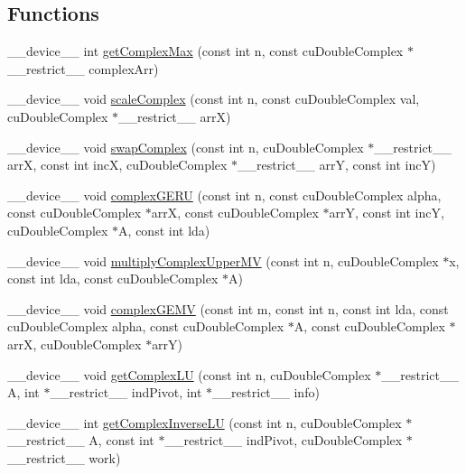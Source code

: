 \subsection*{Functions}
\begin{DoxyCompactItemize}
\item 
\+\_\+\+\_\+device\+\_\+\+\_\+ int \hyperlink{complexInverse_8cu_a8336c0132b5bf7f80e1a65443b2d9465}{get\+Complex\+Max} (const int n, const cu\+Double\+Complex $\ast$\+\_\+\+\_\+restrict\+\_\+\+\_\+ complex\+Arr)
\item 
\+\_\+\+\_\+device\+\_\+\+\_\+ void \hyperlink{complexInverse_8cu_aedd1b59cd1eff341e90ba6c6aaada0fd}{scale\+Complex} (const int n, const cu\+Double\+Complex val, cu\+Double\+Complex $\ast$\+\_\+\+\_\+restrict\+\_\+\+\_\+ arrX)
\item 
\+\_\+\+\_\+device\+\_\+\+\_\+ void \hyperlink{complexInverse_8cu_abfd17009f61cab83a388c2bd3eac58d9}{swap\+Complex} (const int n, cu\+Double\+Complex $\ast$\+\_\+\+\_\+restrict\+\_\+\+\_\+ arrX, const int incX, cu\+Double\+Complex $\ast$\+\_\+\+\_\+restrict\+\_\+\+\_\+ arrY, const int incY)
\item 
\+\_\+\+\_\+device\+\_\+\+\_\+ void \hyperlink{complexInverse_8cu_a4a5ccfb63190cc88035612f5c4cbbe5f}{complex\+G\+E\+RU} (const int n, const cu\+Double\+Complex alpha, const cu\+Double\+Complex $\ast$arrX, const cu\+Double\+Complex $\ast$arrY, const int incY, cu\+Double\+Complex $\ast$A, const int lda)
\item 
\+\_\+\+\_\+device\+\_\+\+\_\+ void \hyperlink{complexInverse_8cu_ad83e7dc7b03a7837b20592aabcfe107c}{multiply\+Complex\+Upper\+MV} (const int n, cu\+Double\+Complex $\ast$x, const int lda, const cu\+Double\+Complex $\ast$A)
\item 
\+\_\+\+\_\+device\+\_\+\+\_\+ void \hyperlink{complexInverse_8cu_ab3e9e304c4d35955cf6f79d7a5a53369}{complex\+G\+E\+MV} (const int m, const int n, const int lda, const cu\+Double\+Complex alpha, const cu\+Double\+Complex $\ast$A, const cu\+Double\+Complex $\ast$arrX, cu\+Double\+Complex $\ast$arrY)
\item 
\+\_\+\+\_\+device\+\_\+\+\_\+ void \hyperlink{complexInverse_8cu_a241fad7ccf21bf3c76f0e8f2235f9897}{get\+Complex\+LU} (const int n, cu\+Double\+Complex $\ast$\+\_\+\+\_\+restrict\+\_\+\+\_\+ A, int $\ast$\+\_\+\+\_\+restrict\+\_\+\+\_\+ ind\+Pivot, int $\ast$\+\_\+\+\_\+restrict\+\_\+\+\_\+ info)
\item 
\+\_\+\+\_\+device\+\_\+\+\_\+ int \hyperlink{complexInverse_8cu_a33967d9901cc0d473f2ce9fdef02330e}{get\+Complex\+Inverse\+LU} (const int n, cu\+Double\+Complex $\ast$\+\_\+\+\_\+restrict\+\_\+\+\_\+ A, const int $\ast$\+\_\+\+\_\+restrict\+\_\+\+\_\+ ind\+Pivot, cu\+Double\+Complex $\ast$\+\_\+\+\_\+restrict\+\_\+\+\_\+ work)

\end{DoxyCompactItemize}
